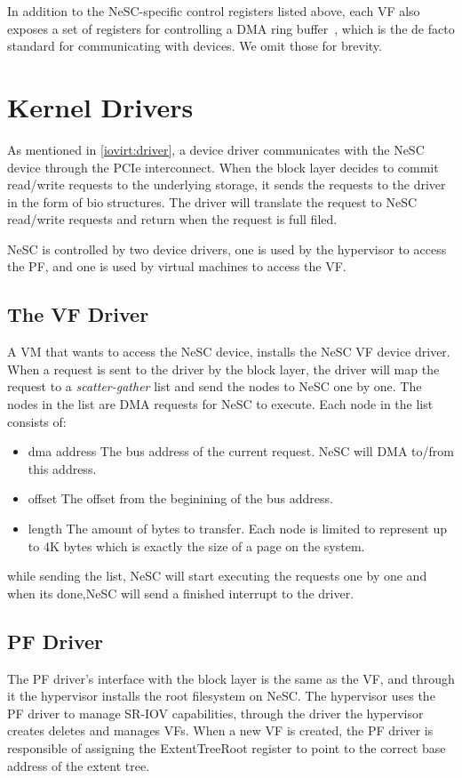 In addition to the NeSC-specific control registers listed above, each VF also exposes a set of registers for controlling a DMA ring buffer~\cite{love10lkd}, which is the de facto standard for communicating with devices. We omit those for brevity.


\section{Kernel Drivers}
\label{arch:drivers}
As mentioned in \ref{iovirt:driver}, a device driver communicates with the NeSC device through the PCIe interconnect.
When the block layer decides to commit read/write requests to the underlying storage, it sends the requests to
the driver in the form of bio structures. The driver will translate the request to NeSC read/write requests and
return when the request is full filed.

NeSC is controlled by two device drivers, one is used by the hypervisor to access the PF, and one is used by
virtual machines to access the VF. 

\subsection*{The VF Driver}
\label{arch:vfdriver}
A VM that wants to access the NeSC device, installs the NeSC VF device driver.
When a request is sent to the driver by the block layer, the driver will map the request to a
\emph{scatter-gather} list and send the nodes to NeSC one by one. The nodes in the list are DMA requests for NeSC to execute. Each node in the list consists of:
\begin{itemize}
\item dma address\quad
  The bus address of the current request. NeSC will DMA to/from this address.  
\item offset \quad
  The offset from the beginining of the bus address.
\item length \quad
  The amount of bytes to transfer. Each node is limited to represent up to 4K bytes which is exactly the size of
  a page on the system.
\end{itemize}

while sending the list, NeSC will start executing the requests one by one and when its done,NeSC will send a finished interrupt to the driver.

\subsection*{PF Driver}
\label{arch:pfdriver}
The PF driver's interface with the block layer is the same as the VF, and through it the hypervisor installs the root filesystem on NeSC.
The hypervisor uses the PF driver to manage SR-IOV capabilities, through the driver the hypervisor creates deletes and manages VFs. When a new VF is created, the PF driver is responsible of assigning the ExtentTreeRoot register to point to the correct base address of the extent tree.

